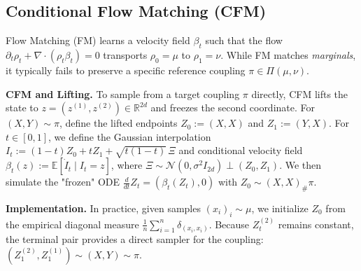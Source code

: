 \documentclass[11pt]{article}
\theoremstyle{definition}
\numberwithin{equation}{section}%
\begin{document}

\subsection{Conditional Flow Matching (CFM)}
Flow Matching (FM) \citep{lipman2023flowmatchinggenerativemodeling} learns a velocity field $\beta_t$ such that the flow $\partial_t\rho_t+\nabla\cdot(\rho_t\beta_t)=0$ transports $\rho_0=\mu$ to $\rho_1=\nu$.
While FM matches \textit{marginals}, it typically fails to preserve a specific reference coupling $\pi \in \Pi(\mu,\nu)$.

\noindent\textbf{CFM and Lifting.} To sample from a target coupling $\pi$ directly, CFM lifts the state to $z=(z^{(1)},z^{(2)})\in\mathbb{R}^{2d}$ and freezes the second coordinate.
For $(X,Y)\sim\pi$, define the lifted endpoints $Z_0:=(X,X)$ and $Z_1:=(Y,X)$. For $t\in[0,1]$, we define the Gaussian interpolation $I_t := (1-t)Z_0+tZ_1+\sqrt{t(1-t)}\,\Xi$ and conditional velocity field $\beta_t(z) := \mathbb{E}[\dot I_t \mid I_t=z]$, where $\Xi\sim\mathcal N(0,\sigma^2 I_{2d}) \perp (Z_0,Z_1)$.
We then simulate the "frozen" ODE $\frac{d}{dt}Z_t=(\beta_t(Z_t),0)$ with $Z_0 \sim (X,X)_{\#}\pi$.

\noindent\textbf{Implementation.} In practice, given samples $(x_i)_i \sim \mu$, we initialize $Z_0$ from the empirical diagonal measure $\frac{1}{n}\sum_{i=1}^n\delta_{(x_i,x_i)}$.
Because $Z_t^{(2)}$ remains constant, the terminal pair provides a direct sampler for the coupling: $(Z_1^{(2)}, Z_1^{(1)}) \sim (X, Y) \sim \pi$.

\end{document}
